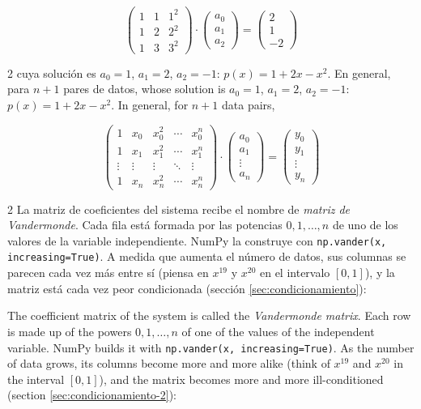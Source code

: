 \begin{equation*}
\begin{pmatrix}
1&1&1^2\\
1&2&2^2\\
1&3&3^2
\end{pmatrix}\cdot \begin{pmatrix}
a_0\\
a_1\\
a_2
\end{pmatrix}=\begin{pmatrix}
2\\
1\\
-2
\end{pmatrix}
\end{equation*}
\begin{paracol}{2}
cuya solución es $a_0=1$, $a_1=2$, $a_2=-1$: $p(x)=1+2x-x^2$. En general, para $n+1$ pares de datos,
\switchcolumn
whose solution is $a_0=1$, $a_1=2$, $a_2=-1$: $p(x)=1+2x-x^2$. In general, for $n+1$ data pairs,
\end{paracol}
\begin{equation*}
\begin{pmatrix}
1&x_0&x_0^2&\cdots &x_0^n\\
1&x_1&x_1^2&\cdots &x_1^n\\
\vdots&\vdots&\vdots&\ddots&\vdots\\
1&x_n&x_n^2&\cdots &x_n^n
\end{pmatrix}\cdot \begin{pmatrix}
a_0\\
a_1\\
\vdots\\
a_n
\end{pmatrix}=\begin{pmatrix}
y_0\\
y_1\\
\vdots\\
y_n
\end{pmatrix}
\end{equation*}
\begin{paracol}{2}
La matriz de coeficientes del sistema recibe el nombre de \emph{matriz de Vandermonde}. Cada fila está formada por las potencias $0, 1, \dots, n$ de uno de los valores de la variable independiente. NumPy la construye con \texttt{np.vander(x, increasing=True)}. A medida que aumenta el número de datos, sus columnas se parecen cada vez más entre sí (piensa en $x^{19}$ y $x^{20}$ en el intervalo $[0,1]$), y la matriz está cada vez peor condicionada (sección \ref{sec:condicionamiento}):

\switchcolumn
The coefficient matrix of the system is called the \emph{Vandermonde matrix}. Each row is made up of the powers $0, 1, \dots, n$ of one of the values of the independent variable. NumPy builds it with \texttt{np.vander(x, increasing=True)}. As the number of data grows, its columns become more and more alike (think of $x^{19}$ and $x^{20}$ in the interval $[0,1]$), and the matrix becomes more and more ill-conditioned (section \ref{sec:condicionamiento-2}):
\end{paracol}

